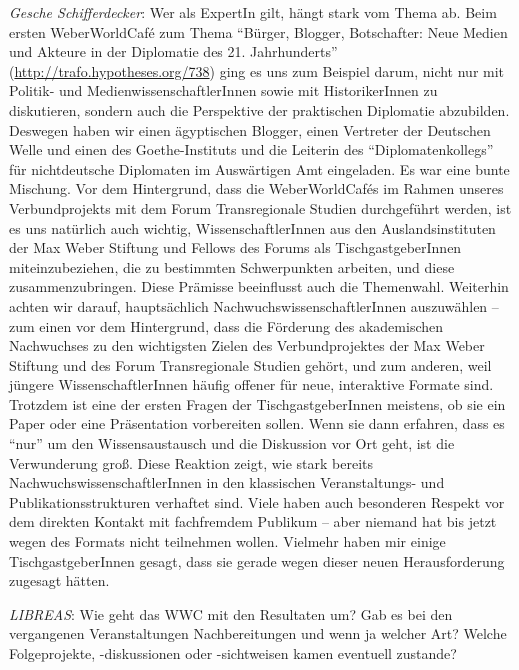 \documentclass[a4paper,
fontsize=11pt,
oneside,
numbers=noperiodatend,
parskip=half-,
bibliography=totoc,
final
]{scrartcl}
\begin{document}
\emph{Gesche Schifferdecker}: Wer als ExpertIn gilt, hängt stark vom
Thema ab. Beim ersten WeberWorldCafé zum Thema \enquote{Bürger, Blogger,
Botschafter: Neue Medien und Akteure in der Diplomatie des 21.
Jahrhunderts} (\url{http://trafo.hypotheses.org/738}) ging es uns zum
Beispiel darum, nicht nur mit Politik- und MedienwissenschaftlerInnen
sowie mit HistorikerInnen zu diskutieren, sondern auch die Perspektive
der praktischen Diplomatie abzubilden. Deswegen haben wir einen
ägyptischen Blogger, einen Vertreter der Deutschen Welle und einen des
Goethe-Instituts und die Leiterin des \enquote{Diplomatenkollegs} für
nichtdeutsche Diplomaten im Auswärtigen Amt eingeladen. Es war eine
bunte Mischung. Vor dem Hintergrund, dass die WeberWorldCafés im Rahmen
unseres Verbundprojekts mit dem Forum Transregionale Studien
durchgeführt werden, ist es uns natürlich auch wichtig,
WissenschaftlerInnen aus den Auslandsinstituten der Max Weber Stiftung
und Fellows des Forums als TischgastgeberInnen miteinzubeziehen, die zu
bestimmten Schwerpunkten arbeiten, und diese zusammenzubringen. Diese
Prämisse beeinflusst auch die Themenwahl. Weiterhin achten wir darauf,
hauptsächlich NachwuchswissenschaftlerInnen auszuwählen -- zum einen vor
dem Hintergrund, dass die Förderung des akademischen Nachwuchses zu den
wichtigsten Zielen des Verbundprojektes der Max Weber Stiftung und des
Forum Transregionale Studien gehört, und zum anderen, weil jüngere
WissenschaftlerInnen häufig offener für neue, interaktive Formate sind.
Trotzdem ist eine der ersten Fragen der TischgastgeberInnen meistens, ob
sie ein Paper oder eine Präsentation vorbereiten sollen. Wenn sie dann
erfahren, dass es \enquote{nur} um den Wissensaustausch und die
Diskussion vor Ort geht, ist die Verwunderung groß. Diese Reaktion
zeigt, wie stark bereits NachwuchswissenschaftlerInnen in den
klassischen Veranstaltungs- und Publikationsstrukturen verhaftet sind.
Viele haben auch besonderen Respekt vor dem direkten Kontakt mit
fachfremdem Publikum -- aber niemand hat bis jetzt wegen des Formats
nicht teilnehmen wollen. Vielmehr haben mir einige TischgastgeberInnen
gesagt, dass sie gerade wegen dieser neuen Herausforderung zugesagt
hätten.

\emph{LIBREAS}: Wie geht das WWC mit den Resultaten um? Gab es bei den
vergangenen Veranstaltungen Nachbereitungen und wenn ja welcher Art?
Welche Folgeprojekte, -diskussionen oder -sichtweisen kamen eventuell
zustande?
\end{document}
